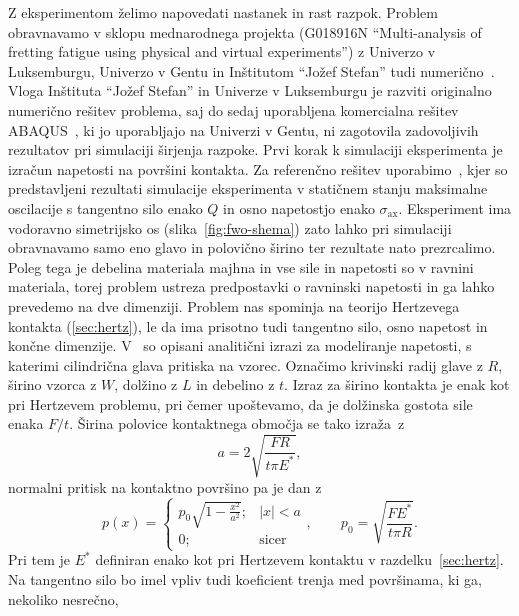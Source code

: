 \documentclass[12pt,a4paper,twoside]{article}
\theoremstyle{definition} %
\theoremstyle{plain} %
\numberwithin{equation}{section}
\newcommand{\sax}{\ensuremath{\sigma_{\text{ax}}}}
\begin{document}
Z eksperimentom želimo napovedati nastanek in rast razpok. Problem obravnavamo v sklopu mednarodnega
projekta (G018916N ``Multi-analysis of fretting fatigue using physical and virtual experiments'') z
Univerzo v Luksemburgu, Univerzo v Gentu in Inštitutom ``Jožef Stefan''  tudi
numerično~\cite{pereira2016convergence}. Vloga Inštituta ``Jožef Stefan'' in Univerze v Luksemburgu
je razviti originalno numerično rešitev problema, saj do sedaj uporabljena komercialna rešitev
ABAQUS\textregistered~\cite{hibbitt2001abaqus}, ki jo uporabljajo na Univerzi v Gentu, ni zagotovila
zadovoljivih rezultatov pri simulaciji širjenja razpoke. Prvi korak k simulaciji eksperimenta je
izračun napetosti na površini kontakta. Za referenčno rešitev
uporabimo~\cite{pereira2016convergence}, kjer so predstavljeni rezultati simulacije eksperimenta v
statičnem stanju maksimalne oscilacije s tangentno silo enako $Q$ in osno napetostjo enako $\sax$.
Eksperiment ima vodoravno simetrijsko os (slika~\ref{fig:fwo-shema}) zato lahko pri simulaciji
obravnavamo samo eno glavo in polovično širino ter rezultate nato prezrcalimo. Poleg tega je
debelina materiala majhna in vse sile in napetosti so v ravnini materiala, torej problem ustreza
predpostavki o ravninski napetosti in ga lahko prevedemo na dve dimenziji. Problem nas spominja na
teorijo Hertzevega kontakta (\ref{sec:hertz}), le da ima prisotno tudi tangentno silo, osno napetost
in končne dimenzije. V~\cite[razdelek 2]{pereira2016convergence} so opisani analitični izrazi za
modeliranje napetosti, s katerimi cilindrična glava pritiska na vzorec. Označimo krivinski radij
glave z $R$, širino vzorca z $W$, dolžino z $L$ in debelino z $t$. Izraz za širino kontakta je enak
kot pri Hertzevem problemu, pri čemer upoštevamo, da je dolžinska gostota sile enaka $F/t$. Širina
polovice kontaktnega območja se tako izraža~z
\begin{equation}
   a = 2\sqrt{\frac{FR}{t \pi E^\ast}},
\end{equation}
normalni pritisk na kontaktno površino pa je dan z
\begin{equation}
  p(x) = \begin{cases}
    p_0 \sqrt{1-\frac{x^2}{a^2}}; & |x| < a \\
    0; & \text{sicer}
  \end{cases}, \qquad p_0 = \sqrt{\frac{FE^\ast}{t \pi R}}.
\end{equation}
Pri tem je $E^\ast$ definiran enako kot pri Hertzevem kontaktu v razdelku~\ref{sec:hertz}.
Na tangentno silo bo imel vpliv tudi koeficient trenja med površinama, ki ga, nekoliko nesrečno,
\end{document}
